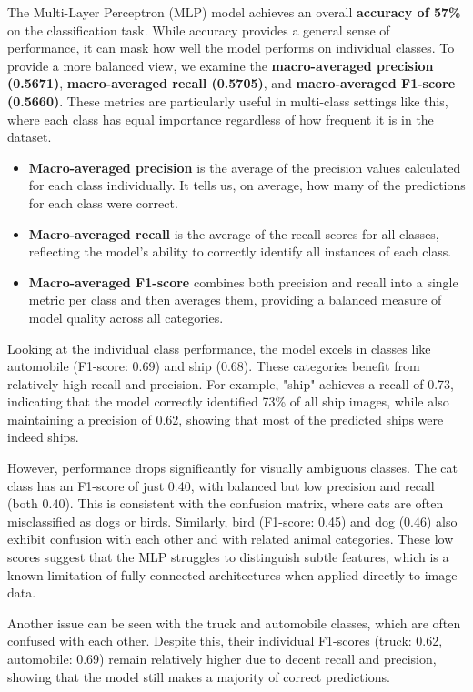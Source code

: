 \documentclass[12pt, a4paper]{report}
\begin{document}
The Multi-Layer Perceptron (MLP) model achieves an overall \textbf{accuracy of 57\%} on the classification task.
While accuracy provides a general sense of performance, it can mask how well the model performs on individual classes.
To provide a more balanced view, we examine the \textbf{macro-averaged precision (0.5671)}, \textbf{macro-averaged recall (0.5705)}, and \textbf{macro-averaged F1-score (0.5660)}.
These metrics are particularly useful in multi-class settings like this, where each class has equal importance regardless of how frequent it is in the dataset.
\begin{itemize}
    \item \textbf{Macro-averaged precision} is the average of the precision values calculated for each class individually.
It tells us, on average, how many of the predictions for each class were correct.
    \item \textbf{Macro-averaged recall} is the average of the recall scores for all classes, reflecting the model's ability to correctly identify all instances of each class.
    \item \textbf{Macro-averaged F1-score} combines both precision and recall into a single metric per class and then averages them, providing a balanced measure of model quality across all categories.
\end{itemize}

Looking at the individual class performance, the model excels in classes like automobile (F1-score: 0.69) and ship (0.68).
These categories benefit from relatively high recall and precision. For example, "ship" achieves a recall of 0.73, indicating that the model correctly identified 73\% of all ship images, while also maintaining a precision of 0.62, showing that most of the predicted ships were indeed ships.

However, performance drops significantly for visually ambiguous classes. The cat class has an F1-score of just 0.40, with balanced but low precision and recall (both 0.40).
This is consistent with the confusion matrix, where cats are often misclassified as dogs or birds.
Similarly, bird (F1-score: 0.45) and dog (0.46) also exhibit confusion with each other and with related animal categories.
These low scores suggest that the MLP struggles to distinguish subtle features, which is a known limitation of fully connected architectures when applied directly to image data.

Another issue can be seen with the truck and automobile classes, which are often confused with each other.
Despite this, their individual F1-scores (truck: 0.62, automobile: 0.69) remain relatively higher due to decent recall and precision, showing that the model still makes a majority of correct predictions.
\end{document}
